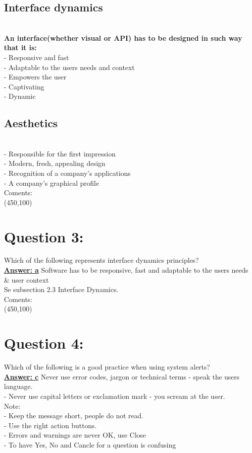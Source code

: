 \documentclass[12pt,a4paper,norsk]{article}
\begin{document}
\subsection{Interface dynamics}\\
\textbf{An interface(whether visual or API) has to be designed in such way that it is:}\\
\indent - Responsive and fast \\
\indent - Adaptable to the users needs and context\\
\indent - Empowers the user\\
\indent - Captivating\\
\indent - Dynamic\\

\subsection{Aesthetics}\\
\indent - Responsible for the first impression\\
\indent - Modern, fresh, appealing design\\
\indent - Recognition of a company's applications\\
\indent - A company's graphical profile\\
\noindent Coments:\\
\framebox(450,100){}\\

\section {Question 3:} Which of the following represents interface dynamics principles?\\
\underline{\textbf{Answer: a}} Software has to be responsive, fast and adaptable to the users needs & user context\\
\noindent Se subsection 2.3 Interface Dynamics.\\

\noindent Coments:\\
\framebox(450,100){}\\

\section {Question 4:} Which of the following is a good practice when using system alerts?\\
\underline{\textbf{Answer: c}} Never use error codes, jargon or technical terms - speak the users language.\\
\indent - Never use capital letters or exclamation mark - you scream at the user.\\
\noindent Note:\\
\indent - Keep the message short, people do not read.\\
\indent - Use the right action buttons.\\
\indent - Errors and warnings are never OK, use Close\\
\indent - To have Yes, No and Cancle for a question is confusing\\
\end{document}
